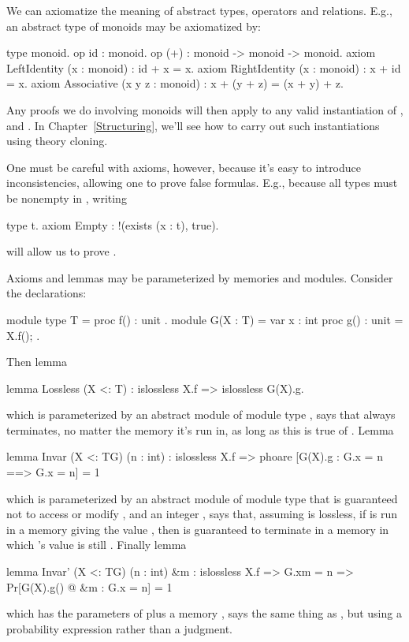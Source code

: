 We can axiomatize the meaning of abstract types, operators and relations.
E.g., an abstract type of monoids may be axiomatized by:
\begin{easycrypt}{}{}
type monoid.
op id : monoid.
op (+) : monoid -> monoid -> monoid.
axiom LeftIdentity (x : monoid) : id + x = x.
axiom RightIdentity (x : monoid) : x + id = x.
axiom Associative (x y z : monoid) : x + (y + z) = (x + y) + z.
\end{easycrypt}
Any proofs we do involving monoids will then apply to any valid
instantiation of ,  and \ec{(+)}. In
Chapter~\ref{Structuring}, we'll see how to carry out such instantiations
using theory cloning.

One must be careful with axioms, however, because it's easy to introduce
inconsistencies, allowing one to prove false formulas. E.g., because
all types must be nonempty in \EasyCrypt, writing
\begin{easycrypt}{}{}
type t.
axiom Empty : !(exists (x : t), true).
\end{easycrypt}
will allow us to prove .

Axioms and lemmas may be parameterized by
memories and modules. Consider the declarations:
\begin{easycrypt}{}{}
module type T = {
  proc f() : unit
}.
module G(X : T) = {
  var x : int
  proc g() : unit = {
    X.f();
  }
}.
\end{easycrypt}
Then lemma 
\begin{easycrypt}{}{}
lemma Lossless (X <: T) : islossless X.f => islossless G(X).g.
\end{easycrypt}
which is parameterized by an abstract module  of module type
, says that  always terminates, no matter the memory
it's run in, as long as this is true of .
Lemma 
\begin{easycrypt}{}{}
lemma Invar (X <: T{G}) (n : int) :
  islossless X.f =>
  phoare [G(X).g : G.x = n ==> G.x = n] = 1%
\end{easycrypt}
which is parameterized by an abstract module  of module type
 that is guaranteed not to access or modify , and an
integer , says that, assuming  is lossless, if
 is run in a memory giving  the value ,
then  is guaranteed to terminate in a memory in which
's value is still .  Finally lemma 
\begin{easycrypt}{}{}
lemma Invar' (X <: T{G}) (n : int) &m :
  islossless X.f => G.x{m} = n =>
  Pr[G(X).g() @ &m : G.x = n] = 1%
\end{easycrypt}
which has the parameters of  plus a memory ,
says the same thing as , but using a probability
expression rather than a \phl judgment.
